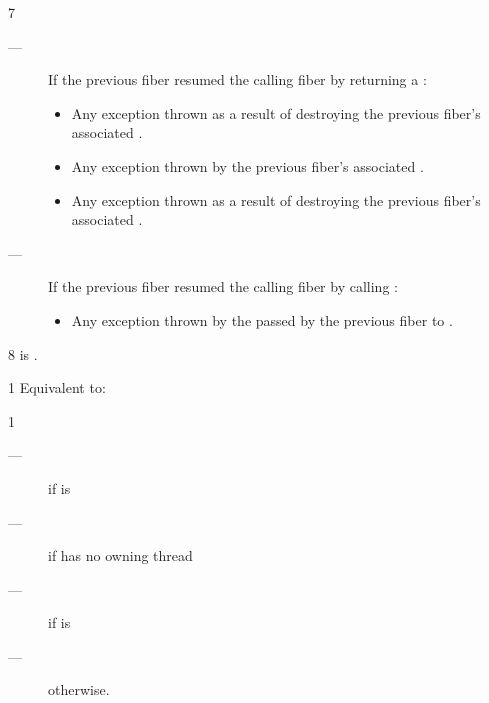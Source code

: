 7 \except
\begin{description}
    \item[---] If the previous fiber resumed the calling fiber by returning a \fiber:
        \begin{itemize}
            \item Any exception thrown as a result of destroying the
                  previous fiber's associated .
            \item Any exception thrown by the previous fiber's
                  associated .
            \item Any exception thrown as a result of destroying the
                  previous fiber's associated .
        \end{itemize}
    \item[---] If the previous fiber resumed the calling fiber by calling \anyresumewith:
        \begin{itemize}
            \item Any exception thrown by the  passed by the previous
                  fiber to \anyresumewith.
        \end{itemize}
\end{description}

8 \postcond
\emptyfn is \true.



1 \effects
Equivalent to:\\


1 \returns
\begin{description}
    \item[---] \false if \emptyfn is \true
    \item[---] \true if \thisfiber has no owning thread
    \item[---] \true if \currthread is \ownthread
    \item[---] \false otherwise.
\end{description}

